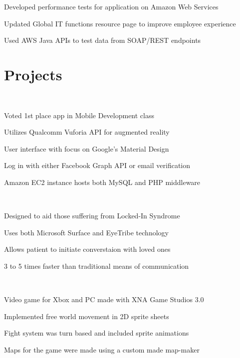 \documentclass[]{deedy-resume-openfont}
\begin{document}
\begin{minipage}[t]{0.66\textwidth}
\begin{tightemize}
\item Developed performance tests for application on Amazon Web Services
\item Updated Global IT functions resource page to improve employee experience
\item Used AWS Java APIs to test data from SOAP/REST endpoints
\end{tightemize}
\sectionsep


\section{Projects}
\href{http://augmonted.github.io}{} \\
\begin{tightemize}
\item Voted 1st place app in Mobile Development class
\item Utilizes Qualcomm Vuforia API for augmented reality
\item User interface with focus on Google's Material Design
\item Log in with either Facebook Graph API or email verification
\item Amazon EC2 instance hosts both MySQL and PHP middleware
\end{tightemize}
\sectionsep

\href{https://www.youtube.com/watch?v=mYUiSeqqgDY&list=PLbbCsk7MUIGfXpnd9XN-pBeCd6ixuCQ2X}{} \\
\begin{tightemize}
\item Designed to aid those suffering from Locked-In Syndrome
\item Uses both Microsoft Surface and EyeTribe technology
\item Allows patient to initiate converstaion with loved ones
\item 3 to 5 times faster than traditional means of communication
\end{tightemize}
\sectionsep

\href{https://github.com/jonwho/ScottTheIntern}{} \\
\begin{tightemize}
\item Video game for Xbox and PC made with XNA Game Studios 3.0
\item Implemented free world movement in 2D sprite sheets
\item Fight system was turn based and included sprite animations
\item Maps for the game were made using a custom made map-maker
\end{tightemize}
\sectionsep


\end{minipage}
\end{document}
